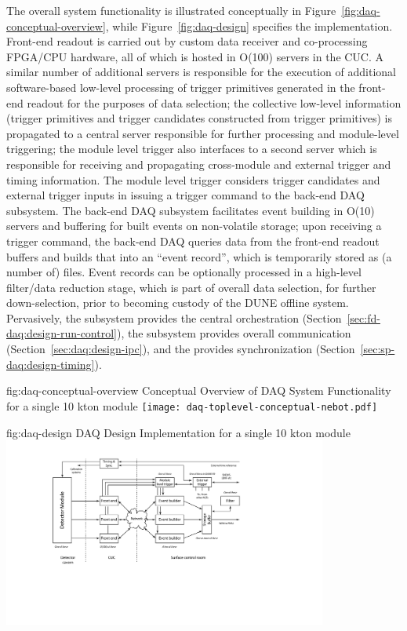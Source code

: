 The overall system functionality is illustrated conceptually in
Figure~\ref{fig:daq-conceptual-overview}, while Figure~\ref{fig:daq-design}
specifies the implementation. Front-end readout is carried out by custom data receiver and
co-processing FPGA/CPU hardware, all of which is hosted in O(100) servers in the CUC. A
similar number of additional servers is responsible for the execution of
additional software-based low-level processing of trigger primitives
generated in the front-end readout for the purposes of data selection; the collective
low-level information (trigger primitives and trigger candidates
constructed from trigger primitives) is propagated to a central server responsible
for further processing and module-level triggering; the module level
trigger also
interfaces to a second server which is responsible for receiving and
propagating cross-module and external trigger and timing
information. The module level trigger considers trigger candidates and
external trigger inputs in issuing a trigger command to the back-end DAQ
subsystem. The back-end DAQ subsystem 
facilitates event building in O(10) servers and buffering for built
events on non-volatile storage; upon receiving a trigger command, the back-end DAQ queries
data from the front-end readout buffers and builds that into an ``event
record'', which is temporarily stored as (a number of) files. Event records can be optionally processed in a high-level
filter/data reduction stage, which is part of overall data selection, for
further down-selection, prior to becoming custody of the DUNE offline
system. Pervasively, the   subsystem provides the central orchestration (Section~\ref{sec:fd-daq:design-run-control}), the  subsystem provides overall communication (Section~\ref{sec:daq:design-ipc}), and the  provides synchronization (Section~\ref{sec:sp-daq:design-timing}).

\begin{dunefigure}{fig:daq-conceptual-overview}{ Conceptual
   Overview of DAQ System Functionality for a single 10 kton module}
  \texttt{[image: daq-toplevel-conceptual-nebot.pdf]}
\end{dunefigure}

\begin{dunefigure}{fig:daq-design}{ DAQ Design
    Implementation for a single 10 kton module}
  \includegraphics[width=0.8\textwidth]{daq-overview.pdf}
\end{dunefigure}

